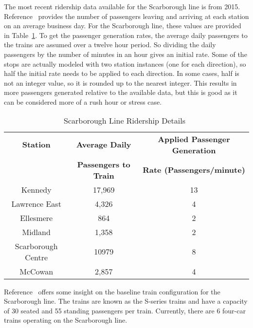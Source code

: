The most recent ridership data available for the Scarborough line is from 2015. Reference~ provides the number of passengers leaving and arriving at each station on an average business day.  For the Scarborough line, these values are provided in Table~\ref{table:ridership}.  To get the passenger generation rates, the average daily passengers to the trains are assumed over a twelve hour period.  So dividing the daily passengers by the number of minutes in an hour gives an initial rate.  Some of the stops are actually modeled with two station instances (one for each direction), so half the initial rate needs to be applied to each direction.  In some cases, half is not an integer value, so it is rounded up to the nearest integer.  This results in more passengers generated relative to the available data, but this is good as it can be considered more of a rush hour or stress case.
%
\begin{table}[htb]
	\centering
	\begin{tabular}{c|c|c}
		\textbf{Station} & \textbf{Average Daily} & \textbf{Applied Passenger Generation} \\
		                 & \textbf{Passengers to Train} & \textbf{Rate (Passengers/minute)} \\
		\hline\hline
		Kennedy & 17,969 & 13 \\
		Lawrence East & 4,326 & 4 \\
		Ellesmere & 864 & 2 \\
		Midland & 1,358 & 2 \\
		Scarborough Centre & 10979 & 8 \\
		McCowan & 2,857 & 4 \\
	\end{tabular}
\caption{Scarborough Line Ridership Details~\cite{ridershipdata}}
\label{table:ridership}
\end{table}

Reference~ offers some insight on the baseline train configuration for the Scarborough line.  The trains are known as the S-series trains and have a capacity of 30 seated and 55 standing passengers per train.  Currently, there are 6 four-car trains operating on the Scarborough line.

